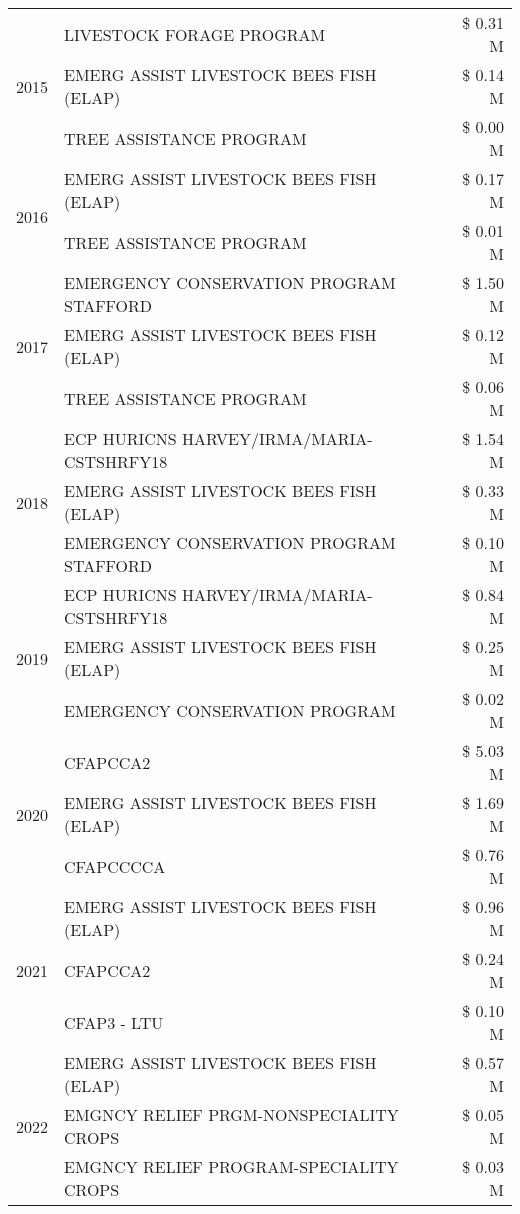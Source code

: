 \begin{tabular}{llr}
\cline{1-3}
\multirow[t]{3}{*}{2015} & LIVESTOCK FORAGE PROGRAM & \$ 0.31 M \\
 & EMERG ASSIST LIVESTOCK BEES FISH (ELAP) & \$ 0.14 M \\
 & TREE ASSISTANCE PROGRAM & \$ 0.00 M \\
\cline{1-3}
\multirow[t]{2}{*}{2016} & EMERG ASSIST LIVESTOCK BEES FISH (ELAP) & \$ 0.17 M \\
 & TREE ASSISTANCE PROGRAM & \$ 0.01 M \\
\cline{1-3}
\multirow[t]{3}{*}{2017} & EMERGENCY CONSERVATION PROGRAM STAFFORD & \$ 1.50 M \\
 & EMERG ASSIST LIVESTOCK BEES FISH (ELAP) & \$ 0.12 M \\
 & TREE ASSISTANCE PROGRAM & \$ 0.06 M \\
\cline{1-3}
\multirow[t]{3}{*}{2018} & ECP HURICNS HARVEY/IRMA/MARIA-CSTSHRFY18 & \$ 1.54 M \\
 & EMERG ASSIST LIVESTOCK BEES FISH (ELAP) & \$ 0.33 M \\
 & EMERGENCY CONSERVATION PROGRAM STAFFORD & \$ 0.10 M \\
\cline{1-3}
\multirow[t]{3}{*}{2019} & ECP HURICNS HARVEY/IRMA/MARIA-CSTSHRFY18 & \$ 0.84 M \\
 & EMERG ASSIST LIVESTOCK BEES FISH (ELAP) & \$ 0.25 M \\
 & EMERGENCY CONSERVATION PROGRAM & \$ 0.02 M \\
\cline{1-3}
\multirow[t]{3}{*}{2020} & CFAPCCA2 & \$ 5.03 M \\
 & EMERG ASSIST LIVESTOCK BEES FISH (ELAP) & \$ 1.69 M \\
 & CFAPCCCCA & \$ 0.76 M \\
\cline{1-3}
\multirow[t]{3}{*}{2021} & EMERG ASSIST LIVESTOCK BEES FISH (ELAP) & \$ 0.96 M \\
 & CFAPCCA2 & \$ 0.24 M \\
 & CFAP3 - LTU & \$ 0.10 M \\
\cline{1-3}
\multirow[t]{3}{*}{2022} & EMERG ASSIST LIVESTOCK BEES FISH (ELAP) & \$ 0.57 M \\
 & EMGNCY RELIEF PRGM-NONSPECIALITY CROPS & \$ 0.05 M \\
 & EMGNCY RELIEF PROGRAM-SPECIALITY CROPS & \$ 0.03 M \\
\cline{1-3}
\bottomrule
\end{tabular}
